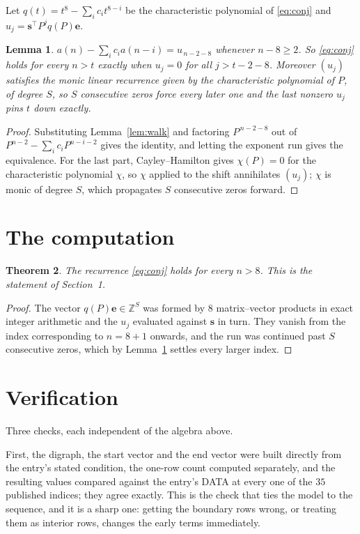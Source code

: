 \documentclass[11pt,a4paper]{article}
\theoremstyle{plain}
\newtheorem{theorem}{Theorem}
\newtheorem{lemma}[theorem]{Lemma}
\theoremstyle{definition}
\begin{document}
Let $q(t)=t^{8}-\sum_i c_i t^{8-i}$ be the characteristic polynomial of
\eqref{eq:conj} and $u_j=\mathbf{s}^{\!\top}P^{j}q(P)\mathbf{e}$.

\begin{lemma}\label{lem:crit}
$a(n)-\sum_i c_i a(n-i)=u_{\,n-2-8}$ whenever $n-8\ge2$. So \eqref{eq:conj}
holds for every $n>t$ exactly when $u_j=0$ for all $j>t-2-8$. Moreover $(u_j)$
satisfies the monic linear recurrence given by the characteristic polynomial of $P$, of
degree $S$, so $S$ consecutive zeros force every later one and the last nonzero $u_j$ pins
$t$ down exactly.
\end{lemma}

\begin{proof}
Substituting Lemma~\ref{lem:walk} and factoring $P^{\,n-2-8}$ out of
$P^{n-2}-\sum_i c_i P^{n-i-2}$ gives the identity, and letting the exponent run gives the
equivalence. For the last part, Cayley--Hamilton gives $\chi(P)=0$ for the characteristic
polynomial $\chi$, so $\chi$ applied to the shift annihilates $(u_j)$; $\chi$ is monic of
degree $S$, which propagates $S$ consecutive zeros forward.
\end{proof}

\section{The computation}

\begin{theorem}
The recurrence \eqref{eq:conj} holds for every $n>8$. This is the statement of
Section~1.
\end{theorem}

\begin{proof}
The vector $q(P)\mathbf{e}\in\mathbb{Z}^{S}$ was formed by $8$ matrix--vector
products in exact integer arithmetic and the $u_j$ evaluated against $\mathbf{s}$ in turn.
They vanish from the index corresponding to $n=8+1$ onwards, and the run was continued
past $S$ consecutive zeros, which by Lemma~\ref{lem:crit} settles every larger index.
\end{proof}

\section{Verification}

Three checks, each independent of the algebra above.

First, the digraph, the start vector and the end vector were built directly from the
entry's stated condition, the one-row count computed separately, and the resulting values
compared against the entry's DATA at every one of the $35$ published indices; they
agree exactly. This is the check that ties the model to the sequence, and it is a sharp one:
getting the boundary rows wrong, or treating them as interior rows, changes the early terms
immediately.
\end{document}
